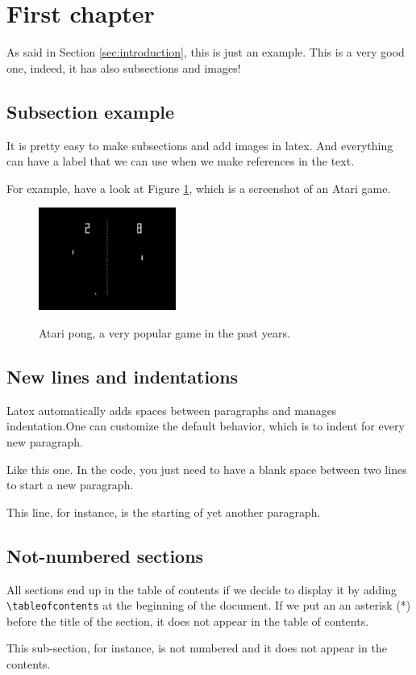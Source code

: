 \section{First chapter}
As said in Section \ref{sec:introduction}, this is just an example. This is a very good one, indeed, it has also subsections and images!

\subsection{Subsection example} 
\label{sec:subection-example}
It is pretty easy to make subsections and add images in latex. And everything can have a label that we can use when we make references in the text. 

For example, have a look at Figure \ref{fig:atari-pong}, which is a screenshot of an Atari game.

\begin{figure}[ht]
	\centering
	\includegraphics[width=0.4\textwidth]{img/atari-pong}
	\label{fig:atari-pong}
	\caption{Atari pong, a very popular game in the past years.}
\end{figure}

\subsection{New lines and indentations}

Latex automatically adds spaces between paragraphs and manages indentation.One can customize the default behavior, which is to indent for every new paragraph. 

Like this one. In the code, you just need to have a blank space between two lines to start a new paragraph.

This line, for instance, is the starting of yet another paragraph.

\subsection*{Not-numbered sections}
All sections end up in the table of contents if we decide to display it by adding \texttt{\textbackslash tableofcontents} at the beginning of the document. If we put an an asterisk (*) before the title of the section, it does not appear in the table of contents.

This sub-section, for instance, is not numbered and it does not appear in the contents.
 